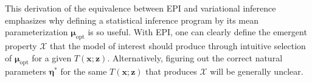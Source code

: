 \documentclass[11pt]{article}
\DeclareMathOperator*{\argmax}{argmax}
\begin{document}
This derivation of the equivalence between EPI and variational inference emphasizes why defining a statistical inference program by its mean parameterization $\bm{\mu}_{\text{opt}}$ is so useful.
With EPI, one can clearly define the emergent property $\mathcal{X}$ that the model of interest should produce through intuitive selection of $\bm{\mu}_{\text{opt}}$ for a given $T(\mathbf{x}; \mathbf{z})$.
Alternatively, figuring out the correct natural parameters $\bm{\eta}^*$ for the same $T(\mathbf{x}; \mathbf{z})$ that produces $\mathcal{X}$ will be generally unclear.

\end{document}
